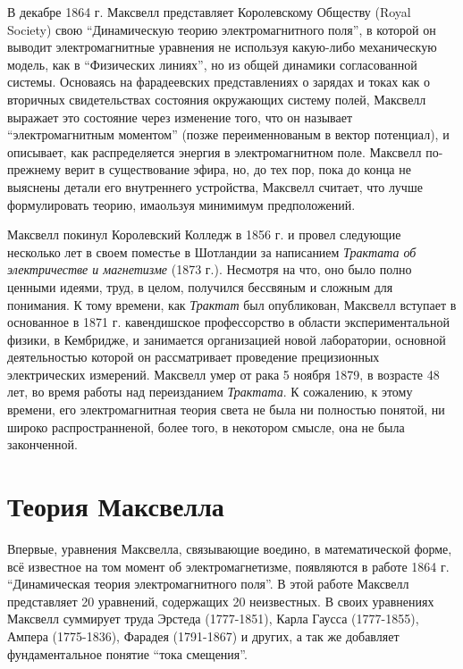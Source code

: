 \documentclass[12pt, oneside, a4paper]{article}
\begin{document}
В декабре 1864 г. Максвелл представляет Королевскому Обществу (Royal Society) свою ``Динамическую теорию электромагнитного поля'', в которой он выводит электромагнитные уравнения не используя какую-либо механическую модель, как в ``Физических линиях'', но из общей динамики согласованной системы. Основаясь на фарадеевских представлениях о зарядах и токах как о вторичных свидетельствах состояния окружающих систему полей, Максвелл выражает это состояние через изменение того, что он называет ``электромагнитным моментом'' (позже переименнованым в вектор потенциал), и описывает, как распределяется энергия в электромагнитном поле. Максвелл по-прежнему верит в существование эфира, но, до тех пор, пока до конца не выяснены детали его внутреннего устройства, Максвелл считает, что лучше формулировать теорию, имаользуя минимимум предположений. 

Максвелл покинул Королевский Колледж в 1856 г. и провел следующие несколько лет в своем поместье в Шотландии за написанием  \emph{Трактата об электричестве и магнетизме} (1873 г.). Несмотря на что, оно было полно ценными идеями, труд, в целом, получился бессвяным и сложным для понимания. К тому времени, как \emph{Трактат} был опубликован, Максвелл вступает в основанное в 1871 г. кавендишское профессорство в области экспериментальной физики, в Кембридже, и занимается организацией новой лаборатории, основной деятельностью которой он рассматривает проведение прецизионных электрических измерений. Максвелл умер от рака 5 ноября 1879, в возрасте 48 лет, во время работы над переизданием \emph{Трактата}. К сожалению, к этому времени, его электромагнитная теория света не была ни полностью понятой, ни широко распространненой, более того, в некотором смысле, она не была законченной.
\section*{Теория Максвелла}
Впервые, уравнения Максвелла, связывающие воедино, в математической форме, всё известное на том момент об электромагнетизме, появляются в работе 1864 г. ``Динамическая теория электромагнитного поля''. В этой работе Максвелл представляет 20 уравнений, содержащих 20 неизвестных.  В своих уравнениях Максвелл суммирует труда Эрстеда (1777-1851), Карла Гаусса (1777-1855), Ампера (1775-1836), Фарадея (1791-1867) и других, а так же добавляет фундаментальное понятие ``тока смещения''.
\end{document}
